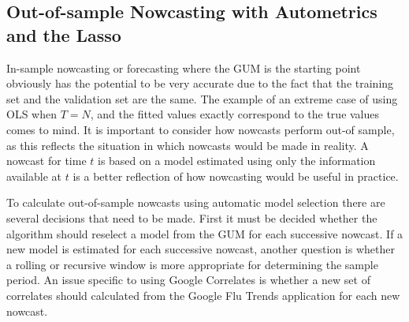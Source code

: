 \subsection{Out-of-sample Nowcasting with Autometrics and the Lasso}

In-sample nowcasting or forecasting where the GUM is the starting point obviously has the potential to be very accurate due to the fact that the training set and the validation set are the same. The example of an extreme case of using OLS when $T=N$, and the fitted values exactly correspond to the true values comes to mind. It is important to consider how nowcasts perform out-of sample, as this reflects the situation in which nowcasts would be made in reality.  A nowcast for time $t$ is based on a model estimated using only the information available at $t$ is a better reflection of how nowcasting would be useful in practice.

To calculate out-of-sample nowcasts using automatic model selection there are several decisions that need to be made. First it must be decided whether the algorithm should reselect a model from the GUM for each successive nowcast. If a new model is estimated for each successive nowcast, another question is whether a rolling or recursive window is more appropriate for determining the sample period. An issue specific to using Google Correlates is whether a new set of correlates should calculated from the Google Flu Trends application for each new nowcast. 

